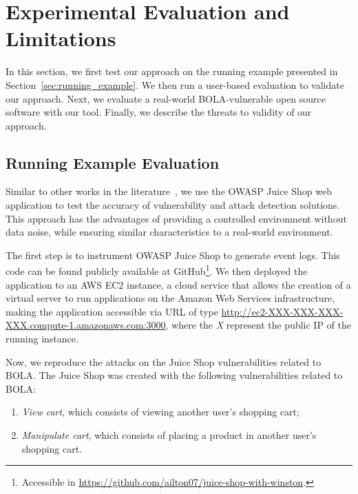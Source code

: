 \section{Experimental Evaluation and Limitations}
\label{sec:evaluation}

\lstset{basicstyle=\ttfamily}

In this section, we first test our approach on the running example presented in Section~\ref{sec:running_example}. We then run a user-based evaluation to validate our approach. Next, we evaluate a real-world BOLA-vulnerable open source software with our tool. Finally, we describe the threats to validity of our approach. 

\subsection{Running Example Evaluation}
\label{sec:running_example_evaluation}

Similar to other works in the literature~\cite{collado2020using,schoenborn2021detecting}, we use the OWASP Juice Shop web application to test the accuracy of vulnerability and attack detection solutions. This approach has the advantages of providing a controlled environment without data noise, while ensuring similar characteristics to a real-world environment. %

The first step is to instrument OWASP Juice Shop to generate event logs. This code can be found publicly available at GitHub\footnote{Accessible in \url{https://github.com/ailton07/juice-shop-with-winston}.}. We then deployed the application to an AWS EC2 instance, a cloud service that allows the creation of a virtual server to run applications on the Amazon Web Services infrastructure, making the application accessible via URL of type \url{http://ec2-XXX-XXX-XXX-XXX.compute-1.amazonaws.com:3000}, where the \textit{X} represent the public IP of the running instance. 

Now, we reproduce the attacks on the Juice Shop vulnerabilities related to BOLA. The Juice Shop was created with the following vulnerabilities related to BOLA:
\begin{enumerate}[{\sc {Vulnerability} 1.}]
    \item \textit{View cart}, which consists of viewing another user's shopping cart; %
    \item \textit{Manipulate cart}, which consists of placing a product in another user's shopping cart.
\end{enumerate}




